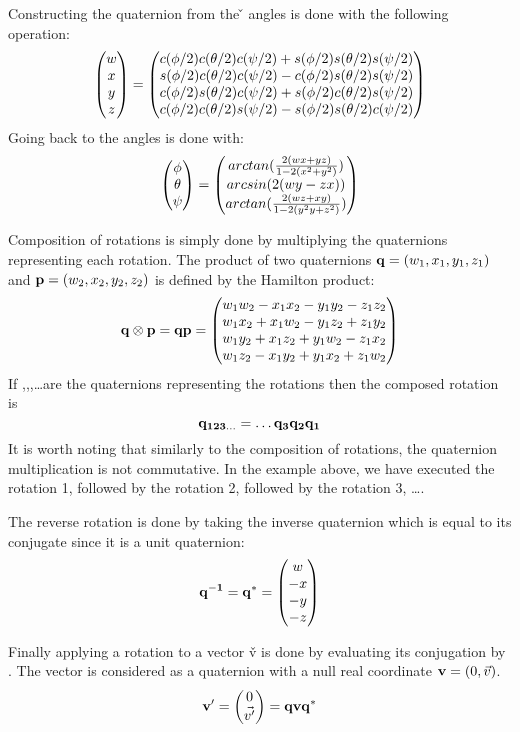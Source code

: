 Constructing the quaternion from the \v{\theta} angles is done with the
following operation:
\begin{equation}
	\begin{pmatrix}w\\x\\y\\z\end{pmatrix} = \begin{pmatrix}
		c(\phi/2)c(\theta/2)c(\psi/2)+s(\phi/2)s(\theta/2)s(\psi/2)\\
		s(\phi/2)c(\theta/2)c(\psi/2)-c(\phi/2)s(\theta/2)s(\psi/2)\\
		c(\phi/2)s(\theta/2)c(\psi/2)+s(\phi/2)c(\theta/2)s(\psi/2)\\
		c(\phi/2)c(\theta/2)s(\psi/2)-s(\phi/2)s(\theta/2)c(\psi/2)
	\end{pmatrix}
\end{equation}
 Going back to the angles is done with:
 \begin{equation}
	\begin{pmatrix}\phi\\\theta\\\psi\end{pmatrix} = \begin{pmatrix}
		arctan(\frac{2(wx + yz)}{1-2(x^2 + y^2)})\\
		arcsin(2(wy - zx))\\
		arctan(\frac{2(wz + xy)}{1-2(y^2y + z^2)})
	\end{pmatrix}
\end{equation}

Composition of rotations is simply done by multiplying the quaternions
representing each rotation. The product of two quaternions $\mathbf{q} =
(w_1,x_1,y_1,z_1)$ and $\mathbf{p} = (w_2,x_2,y_2,z_2)$ is defined by the Hamilton
product:
\begin{equation}
	\mathbf{q}\otimes\mathbf{p} = \mathbf{q}\mathbf{p} = \begin{pmatrix}
	w_1w_2 - x_1x_2 - y_1y_2 - z_1z_2\\
	w_1x_2 + x_1w_2 - y_1z_2 + z_1y_2\\
	w_1y_2 + x_1z_2 + y_1w_2 - z_1x_2\\
	w_1z_2 - x_1y_2 + y_1x_2 + z_1w_2
	\end{pmatrix}
\end{equation}
If ,,,\ldots are the quaternions representing the
rotations then the composed rotation  is
\begin{equation}
	\mathbf{q_{123\ldots}} = \ldots\mathbf{q_3}\mathbf{q_2}\mathbf{q_1}
\end{equation}
It is worth noting that similarly to the composition of rotations, the
quaternion multiplication is not commutative. In the example above, we have
executed the rotation 1, followed by the rotation 2, followed by the rotation 3,
\ldots.

The reverse rotation is done by taking the inverse quaternion which is equal to
its conjugate since it is a unit quaternion:
\begin{equation}
	\mathbf{q^{-1}} = \mathbf{q^{*}} = \begin{pmatrix}w\\-x\\-y\\-z\end{pmatrix} 
\end{equation}

Finally applying a rotation  to a vector \v{v} is done by evaluating its
conjugation by . The vector is considered as a quaternion with a null real
coordinate $\mathbf{v} = (0,\vec{v})$.
\begin{equation}
	\mathbf{v'} = \begin{pmatrix}0\\\vec{v'}\end{pmatrix} = \mathbf{q}\mathbf{v}\mathbf{q^{*}}
\end{equation}


